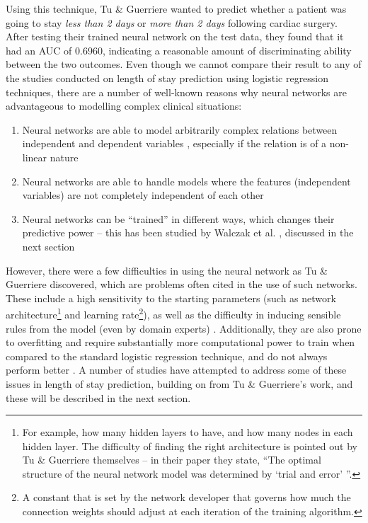 Using this technique,
Tu \& Guerriere wanted to predict whether a patient was going to stay
\textit{less than 2 days} or \textit{more than 2 days} following cardiac
surgery. After testing their trained neural network on the test data, they
found that it had an AUC of 0.6960, indicating a reasonable amount of
discriminating ability between the two outcomes. Even though we cannot compare
their result to any of the studies conducted on length of stay prediction
using logistic regression techniques, there are a number of well-known reasons
why neural networks are advantageous to modelling complex clinical situations:
\begin{enumerate}
\item Neural networks are able to model arbitrarily complex relations between
independent and dependent variables \citep{Tu1996,Buchman1994}, especially if
the relation is of a non-linear nature
\item Neural networks are able to handle models where the features (independent
variables) are not completely independent of each other
\item Neural networks can be ``trained'' in different ways, which changes their
predictive power -- this has been studied by Walczak et al. \citep{Walczak2003},
discussed in the next section
\end{enumerate}

However, there were a few difficulties in using the neural network as Tu \&
Guerriere discovered, which are problems often cited in the use of such
networks. These include a high sensitivity to the starting parameters (such as
network architecture\footnote{For example, how many hidden layers to have, and
how many nodes in each hidden layer. The difficulty of finding the right
architecture is pointed out by Tu \& Guerriere themselves -- in their paper
they state, ``The optimal structure of the neural network model was determined
by `trial and error' ''.}
and learning rate\footnote{A constant that is set by the
network developer that governs how much the connection weights should adjust at
each iteration of the training algorithm.}), as well as the difficulty in
inducing sensible rules from the model (even by domain
experts) \citep{Bellazzi2008}. Additionally, they are also prone to overfitting
and require substantially more computational power to train when compared to
the standard logistic regression technique, and do not always perform
better \citep{Harper2005}. A number of studies have attempted to address some of
these issues in length of stay prediction, building on from Tu \& Guerriere's
work, and these will be described in the next section.

